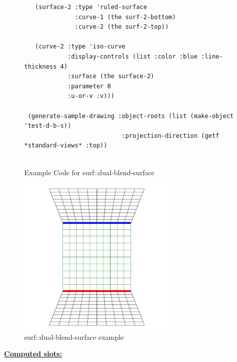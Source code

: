 \documentclass [11pt]{book}
\begin{document}
\begin{itemize}
\begin{figure}
\begin{lrbox}{\boxedverb}
\begin{minipage}{\linewidth}
{\begin{verbatim}
   (surface-2 :type 'ruled-surface
              :curve-1 (the surf-2-bottom)
              :curve-2 (the surf-2-top))
    
   (curve-2 :type 'iso-curve
            :display-controls (list :color :blue :line-thickness 4)
            :surface (the surface-2)
            :parameter 0
            :u-or-v :v)))

 (generate-sample-drawing :object-roots (list (make-object 'test-d-b-s))
                           :projection-direction (getf *standard-views* :top))
 
\end{verbatim}}
\end{minipage}
\end{lrbox}
\fbox{\usebox{\boxedverb}}

\caption{Example Code for surf::dual-blend-surface}

\label{fig:example-code-surf::dual-blend-surface}

\end{figure}

\begin{figure}
\begin{center}
\includegraphics[width=3in,height=3in]{../images/example-dual-blend-surface.pdf}
\end{center}

\caption{surf::dual-blend-surface example}

\label{fig:surf::dual-blend-surface}

\end{figure}





\textbf{
\underline{Computed slots:}}

\begin{description}


\end{description}
\end{itemize}
\end{document}
